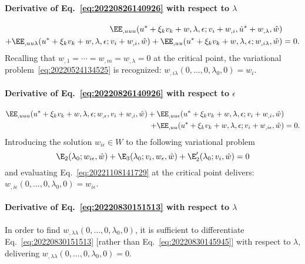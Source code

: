 \paragraph{Derivative of Eq.~\eqref{eq:20220826140926} with respect to \(\lambda\)}
\begin{equation}
  \begin{aligned}[b]
    \EE_{,uuu}(u^\ast + \xi_k v_k + w, \lambda, \epsilon; v_i + w_{,i}, \dot{u}^\ast + w_{,\lambda}, \hat{w}) &\\
    + \EE_{,uu\lambda}(u^\ast + \xi_k v_k + w, \lambda, \epsilon; v_i + w_{,i}, \hat{w}) + \EE_{,uu}(u^\ast + \xi_k v_k + w, \lambda, \epsilon; w_{,i\lambda}, \hat{w}) &= 0.
  \end{aligned}
\end{equation}
Recalling that $w_{,1} = \cdots = w_{,m} = w_{,\lambda} = 0$ at the critical point, the variational
problem~\eqref{eq:20220524134525} is recognized: \(w_{,i\lambda}(0, \ldots, 0, \lambda_0, 0)=w_i\).

\paragraph{Derivative of Eq.~\eqref{eq:20220826140926} with respect to \(\epsilon\)}
\begin{equation}
  \label{eq:20221108141729}
  \begin{aligned}[b]
    \EE_{,uuu}(u^\ast + \xi_k v_k + w, \lambda, \epsilon; w_{,\epsilon}, v_i + w_{,i}, \hat{w}) + \EE_{,uu\epsilon}(u^\ast + \xi_k v_k + w, \lambda, \epsilon; v_i + w_{,i}, \hat{w}) &\\
    + \EE_{,uu}(u^\ast + \xi_k v_k + w, \lambda, \epsilon; v_i + w_{,i\epsilon}, \hat{w}) &= 0.
  \end{aligned}
\end{equation}
Introducing the solution \(w_{i\epsilon} \in W\) to the following variational problem
\begin{equation}
  \label{eq:20221030180004}
  \E_2(\lambda_0; w_{i\epsilon}, \hat{w}) + \E_3(\lambda_0; v_i, w_\epsilon, \hat{w}) + \E_2'(\lambda_0; v_i, \hat{w}) = 0
\end{equation}
and evaluating Eq.~\eqref{eq:20221108141729} at the critical point delivers: \(w_{,i\epsilon}(0, \ldots, 0, \lambda_0, 0)=w_{i\epsilon}\).

\paragraph{Derivative of Eq.~\eqref{eq:20220830151513} with respect to \(\lambda\)}
In order to find \(w_{,\lambda\lambda}(0, \ldots, 0, \lambda_0, 0)\), it is sufficient to differentiate Eq.~\eqref{eq:20220830151513} [rather
than Eq.~\eqref{eq:20220830145945}] with respect to \(\lambda\), delivering \(w_{,\lambda\lambda}(0, \ldots, 0, \lambda_0, 0)=0\).

